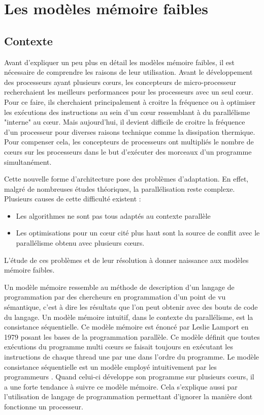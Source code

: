 \documentclass[12pt,a4paper]{article}
\begin{document}

\section{Les modèles mémoire faibles}

\subsection{Contexte}

Avant d'expliquer un peu plus en détail les modèles mémoire faibles, il est nécessaire de comprendre les raisons de leur utilisation. Avant le développement des processeurs ayant plusieurs cœurs, les concepteurs de micro-processeur recherchaient les meilleurs performances pour les processeurs avec un seul cœur. Pour ce faire, ils cherchaient principalement à croitre la fréquence ou à optimiser les exécutions des instructions au sein d'un cœur ressemblant à du parallélisme "interne" au cœur. Mais aujourd'hui, il devient difficile de croitre la fréquence d'un processeur pour diverses raisons technique comme la dissipation thermique. Pour compenser cela, les concepteurs de processeurs ont multipliés le nombre de cœurs sur les processeurs dans le but d'exécuter des morceaux d'un programme simultanément.

Cette nouvelle forme d'architecture pose des problèmes d'adaptation. En effet, malgré de nombreuses études théoriques, la parallélisation reste complexe. Plusieurs causes de cette difficulté existent :
\begin{itemize}
	\item Les algorithmes ne sont pas tous adaptés au contexte parallèle
	\item Les optimisations pour un cœur cité plus haut sont la source de conflit avec le parallélisme obtenu avec plusieurs cœurs. 
\end{itemize}
L'étude de ces problèmes et de leur résolution à donner naissance aux modèles mémoire faibles.

Un modèle mémoire ressemble au méthode de description d'un langage de programmation par des chercheurs en programmation d'un point de vu sémantique, c'est à dire les résultats que l'on peut obtenir avec des bouts de code du langage. Un modèle mémoire intuitif, dans le contexte du parallélisme, est la consistance séquentielle. Ce modèle mémoire est énoncé par Leslie Lamport en 1979 posant les bases de la programmation parallèle. Ce modèle définit que toutes exécutions du programme multi cœurs se faisait toujours en exécutant les instructions de chaque thread une par une dans l'ordre du programme. Le modèle  consistance séquentielle est un modèle employé intuitivement par les programmeurs \cite{Boehm:2011:YDK:2076796.2088916}. Quand celui-ci développe son programme sur plusieurs cœurs, il a une forte tendance à suivre ce modèle mémoire. Cela s'explique aussi par l'utilisation de langage de programmation permettant d'ignorer la manière dont fonctionne un processeur.  
\end{document}

